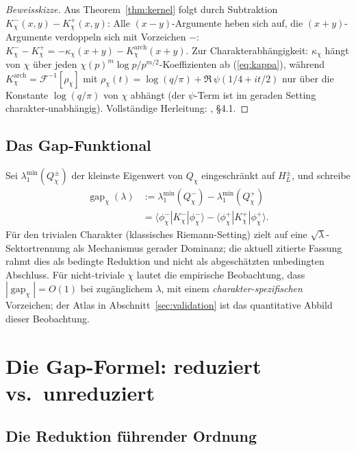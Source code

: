 \documentclass[a4paper,10pt,twocolumn]{article}
\theoremstyle{definition}
\theoremstyle{remark}
\newcommand{\gap}{\operatorname{gap}}
\newcommand{\chifn}{\chi}
\begin{document}
\begin{proof}[Beweisskizze]
Aus Theorem~\ref{thm:kernel} folgt durch Subtraktion
$K_\chi^-(x,y)-K_\chi^+(x,y)$: Alle $(x-y)$-Argumente heben sich auf,
die $(x+y)$-Argumente verdoppeln sich mit Vorzeichen $-$:
$K_\chi^- - K_\chi^+ = -\kappa_\chi(x+y) - K^{\mathrm{arch}}_\chi(x+y)$.
Zur Charakterabhängigkeit: $\kappa_\chi$ hängt von $\chifn$ über jeden
$\chifn(p)^m\log p / p^{m/2}$-Koeffizienten ab (\eqref{eq:kappa}),
während $K^{\mathrm{arch}}_\chi=\mathcal{F}^{-1}[\rho_\chi]$ mit
$\rho_\chi(t)=\log(q/\pi)+\Re\,\psi(1/4+it/2)$ nur über die Konstante
$\log(q/\pi)$ von $\chifn$ abhängt (der $\psi$-Term ist im geraden
Setting charakter-unabhängig). Vollständige Herleitung:
\cite{AnalyticKernel}, \S4.1.
\end{proof}

\subsection{Das Gap-Funktional}

Sei $\lambda_1^{\min}(Q_{\chifn}^\pm)$ der kleinste Eigenwert
von $Q_{\chifn}$ eingeschränkt auf $H_L^\pm$, und schreibe
\begin{equation}
\label{eq:gap-def}
\begin{aligned}
  \gap_{\chifn}(\lambda)
    &:=\lambda_1^{\min}(Q_{\chifn}^-)
      -\lambda_1^{\min}(Q_{\chifn}^+)\\
    &=\langle\phi_{\chifn}^-|K_{\chifn}^-|\phi_{\chifn}^-\rangle
      -\langle\phi_{\chifn}^+|K_{\chifn}^+|\phi_{\chifn}^+\rangle.
\end{aligned}
\end{equation}
Für den trivialen Charakter (klassisches Riemann-Setting) zielt
\cite{RH_II} auf eine $\sqrt{\lambda}$-Sektortrennung als Mechanismus
gerader Dominanz; die aktuell zitierte Fassung rahmt dies als bedingte
Reduktion und nicht als abgeschätzten unbedingten Abschluss. Für
nicht-triviale $\chifn$ lautet die empirische Beobachtung, dass
$|\gap_{\chifn}|=O(1)$ bei zugänglichem $\lambda$, mit
einem \emph{charakter-spezifischen} Vorzeichen; der Atlas in
Abschnitt~\ref{sec:validation} ist das quantitative Abbild dieser
Beobachtung.

\section{Die Gap-Formel: reduziert vs.\ unreduziert}
\label{sec:formula}

\subsection{Die Reduktion führender Ordnung}
\label{sec:formula-reduced}
\end{document}
